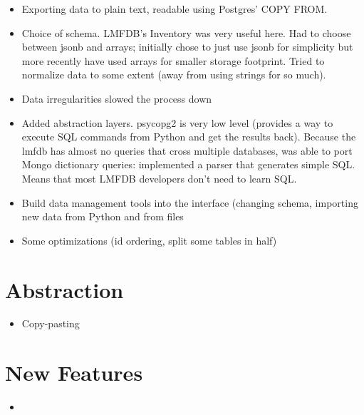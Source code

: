 \documentclass{article}
\begin{document}
\begin{itemize}
\item Exporting data to plain text, readable using Postgres' COPY FROM.
\item Choice of schema.  LMFDB's Inventory was very useful here.  Had to choose between jsonb and arrays; initially chose to just use jsonb for simplicity but more recently have used arrays for smaller storage footprint.  Tried to normalize data to some extent (away from using strings for so much). 
\item Data irregularities slowed the process down
\item Added abstraction layers.  psycopg2 is very low level (provides a way to execute SQL commands from Python and get the results back).  Because the lmfdb has almost no queries that cross multiple databases, was able to port Mongo dictionary queries: implemented a parser that generates simple SQL.  Means that most LMFDB developers don't need to learn SQL.
\item Build data management tools into the interface (changing schema, importing new data from Python and from files
\item Some optimizations (id ordering, split some tables in half)
\end{itemize}

\section{Abstraction}

\begin{itemize}
\item Copy-pasting
\end{itemize}

\section{New Features}

\begin{itemize}
\item
\end{itemize}
\end{document}
